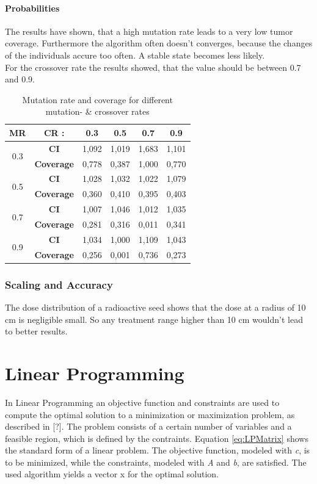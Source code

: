 \documentclass[12pt]{article}
\begin{document}
\newpage
\paragraph{Probabilities} 
The results have shown, that a high mutation rate leads to a very low tumor coverage. Furthermore the algorithm often doesn't converges, because the changes of the individuals accure too often. A stable state becomes less likely. \\ For the crossover rate the results showed, that the value should be between 0.7 and 0.9.
\begin{table}[h]
\label{table:probabilities}
\begin{tabular}{c|ccccc}
\textbf{MR}          & \textbf{CR :}     & 0.3   & 0.5   & 0.7   & 0.9   \\ \hline
\multirow{2}{*}{0.3} & \textbf{CI}       & 1,092 & 1,019 & 1,683 & 1,101 \\
                     & \textbf{Coverage} & 0,778 & 0,387 & 1,000 & 0,770 \\ \hline
\multirow{2}{*}{0.5} & \textbf{CI}       & 1,028 & 1,032 & 1,022 & 1,079 \\
                     & \textbf{Coverage} & 0,360 & 0,410 & 0,395 & 0,403 \\ \hline
\multirow{2}{*}{0.7} & \textbf{CI}       & 1,007 & 1,046 & 1,012 & 1,035 \\
                     & \textbf{Coverage} & 0,281 & 0,316 & 0,011 & 0,341 \\ \hline
\multirow{2}{*}{0.9} & \textbf{CI}       & 1,034 & 1,000 & 1,109 & 1,043 \\
                     & \textbf{Coverage} & 0,256 & 0,001 & 0,736 & 0,273 \\
\end{tabular}
\caption{Mutation rate and coverage for different mutation-  \& crossover rates}

\end{table}
\subsubsection{Scaling and Accuracy}
The dose distribution of a radioactive seed shows that the dose at a radius of 10 cm is negligible small. So any treatment range higher than 10 cm wouldn't lead to better results. 


\section{Linear Programming}
In Linear Programming an objective function and constraints are used to compute the optimal solution to a minimization or maximization problem, as described in [?]. The problem consists of a certain number of variables and a feasible region, which is defined by the contraints. 
Equation \eqref{eq:LPMatrix} shows the standard form of a linear problem. The objective function, modeled with \textit{c},  is to be minimized, while the constraints, modeled with \textit{A} and \textit{b}, are satisfied. The used algorithm yields a vector x for the optimal solution.
\end{document}
